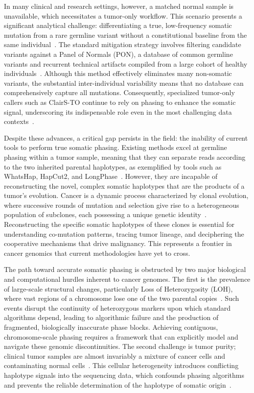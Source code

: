 \documentclass[pdflatex,sn-nature]{sn-jnl}
\begin{document}
In many clinical and research settings, however, a matched normal sample is unavailable, which necessitates a tumor-only workflow. This scenario presents a significant analytical challenge: differentiating a true, low-frequency somatic mutation from a rare germline variant without a constitutional baseline from the same individual~\cite{sun2018, hiltemann2015, huang2018}. The standard mitigation strategy involves filtering candidate variants against a Panel of Normals (PON), a database of common germline variants and recurrent technical artifacts compiled from a large cohort of healthy individuals~\cite{cibulskis2013}. Although this method effectively eliminates many non-somatic variants, the substantial inter-individual variability means that no database can comprehensively capture all mutations. Consequently, specialized tumor-only callers such as ClairS-TO continue to rely on phasing to enhance the somatic signal, underscoring its indispensable role even in the most challenging data contexts~\cite{chen2025}.

Despite these advances, a critical gap persists in the field: the inability of current tools to perform true somatic phasing. Existing methods excel at germline phasing within a tumor sample, meaning that they can separate reads according to the two inherited parental haplotypes, as exemplified by tools such as WhatsHap, HapCut2, and LongPhase~\cite{martin2016, edge2017, lin2022}. However, they are incapable of reconstructing the novel, complex somatic haplotypes that are the products of a tumor's evolution. Cancer is a dynamic process characterized by clonal evolution, where successive rounds of mutation and selection give rise to a heterogeneous population of subclones, each possessing a unique genetic identity~\cite{nowell1976}. Reconstructing the specific somatic haplotypes of these clones is essential for understanding co-mutation patterns, tracing tumor lineage, and deciphering the cooperative mechanisms that drive malignancy. This represents a frontier in cancer genomics that current methodologies have yet to cross.

The path toward accurate somatic phasing is obstructed by two major biological and computational hurdles inherent to cancer genomes. The first is the prevalence of large-scale structural changes, particularly Loss of Heterozygosity (LOH), where vast regions of a chromosome lose one of the two parental copies~\cite{nichols2020, regan2024, hwang2021}. Such events disrupt the continuity of heterozygous markers upon which standard algorithms depend, leading to algorithmic failure and the production of fragmented, biologically inaccurate phase blocks. Achieving contiguous, chromosome-scale phasing requires a framework that can explicitly model and navigate these genomic discontinuities. The second challenge is tumor purity; clinical tumor samples are almost invariably a mixture of cancer cells and contaminating normal cells~\cite{yadav2015, zheng2017, rhee2018}. This cellular heterogeneity introduces conflicting haplotype signals into the sequencing data, which confounds phasing algorithms and prevents the reliable determination of the haplotype of somatic origin~\cite{foltz2024}.
\end{document}
